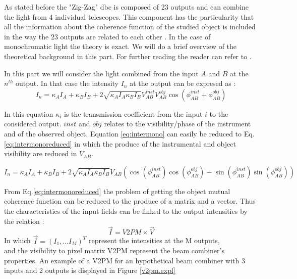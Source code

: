 As stated before the "Zig-Zag" \gls{dbc} is composed of 23 outputs and can combine the light from 4 individual telescopes. This component has the particularity that all the information about the coherence function of the studied object is included in the way the 23 outputs are related to each other \cite{tatulli}. In the case of monochromatic light the theory is exact. We will do a brief overview of the theoretical background in this part. For further reading the reader can refer to \cite{tatulli, saviauk, Diener2017}.

In this part we will consider the light combined from the input $A$ and $B$ at the $n^{th}$ output. In that case the intensity $I_n$ at the output can be expresed as :
\begin{equation}\label{eq:intermono}
 I_n = \kappa_AI_A+\kappa_BI_B+2\sqrt{\kappa_AI_A\kappa_BI_B}V_{AB}^{inst}V_{AB}^{obj}\cos(\phi_{AB}^{inst}+\phi_{AB}^{obj})
\end{equation}

In this equation $\kappa_i$ is the transmission coefficient from the input $i$ to the considered output. $inst$ and $obj$ relates to the visibility/phase of the instrument and of the observed object. Equation \ref{eq:intermono} can easily be reduced to Eq.\ref{eq:intermonoreduced} in which the produce of the instrumental and object visibility are reduced in $V_{AB}$.

\begin{equation}\label{eq:intermonoreduced}
  I_n = \kappa_AI_A+\kappa_BI_B+2\sqrt{\kappa_AI_A\kappa_BI_B}V_{AB}\left(\cos(\phi_{AB}^{inst})\cos(\phi_{AB}^{obj})-\sin(\phi_{AB}^{inst})\sin(\phi_{AB}^{obj})\right)
\end{equation}

From Eq.\ref{eq:intermonoreduced} the problem of getting the object mutual coherence function can be reduced to the produce of a matrix and a vector. 
Thus the
characteristics of the input fields can be linked to the output
intensities by the relation :
\begin{equation}
  \vec{I} = V2PM \times \vec{V}
\end{equation}
In which $\vec{I} = (I_1,...I_M)^T$ represent the intensities at the M outputs, \\ 
and the visibility to pixel matrix V2PM represent the beam combiner's properties. An example of a V2PM for an hypothetical beam combiner
with 3 inputs and 2 outputs is displayed in Figure \ref{v2pm.expl}

